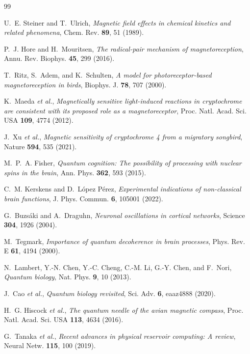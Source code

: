 \documentclass[aps,prx,reprint,superscriptaddress,nofootinbib,floatfix]{revtex4-2}
\begin{document}
\begin{thebibliography}{99}  
          
 U.~E. Steiner and T.~Ulrich,
\textit{Magnetic field effects in chemical kinetics and related phenomena},
Chem. Rev. \textbf{89}, 51 (1989).
 
 P.~J. Hore and H.~Mouritsen,
\textit{The radical-pair mechanism of magnetoreception},
Annu. Rev. Biophys. \textbf{45}, 299 (2016).

 T.~Ritz, S.~Adem, and K.~Schulten,
\textit{A model for photoreceptor-based magnetoreception in birds},
Biophys. J. \textbf{78}, 707 (2000).

 K.~Maeda \textit{et al.},
\textit{Magnetically sensitive light-induced reactions in cryptochrome are
consistent with its proposed role as a magnetoreceptor},
Proc. Natl. Acad. Sci. USA \textbf{109}, 4774 (2012).

 J.~Xu \textit{et al.},
\textit{Magnetic sensitivity of cryptochrome 4 from a migratory songbird},
Nature \textbf{594}, 535 (2021).

 M.~P.~A. Fisher,
\textit{Quantum cognition: The possibility of processing with nuclear spins in the
brain}, Ann. Phys. \textbf{362}, 593 (2015).

 C.~M. Kerskens and D.~López Pérez,
\textit{Experimental indications of non-classical brain functions},
J. Phys. Commun. \textbf{6}, 105001 (2022).

 G.~Buzsáki and A.~Draguhn,
\textit{Neuronal oscillations in cortical networks},
Science \textbf{304}, 1926 (2004).

 M.~Tegmark,
\textit{Importance of quantum decoherence in brain processes},
Phys. Rev. E \textbf{61}, 4194 (2000).

 N.~Lambert, Y.-N. Chen, Y.-C. Cheng, C.-M. Li, G.-Y. Chen,
and F.~Nori, \textit{Quantum biology}, Nat. Phys. \textbf{9}, 10 (2013).

 J.~Cao \textit{et al.},
\textit{Quantum biology revisited}, Sci. Adv. \textbf{6}, eaaz4888 (2020).

 H.~G. Hiscock \textit{et al.},
\textit{The quantum needle of the avian magnetic compass},
Proc. Natl. Acad. Sci. USA \textbf{113}, 4634 (2016).

 G.~Tanaka \textit{et al.},
\textit{Recent advances in physical reservoir computing: A review},
Neural Netw. \textbf{115}, 100 (2019).


\end{thebibliography}
\end{document}
